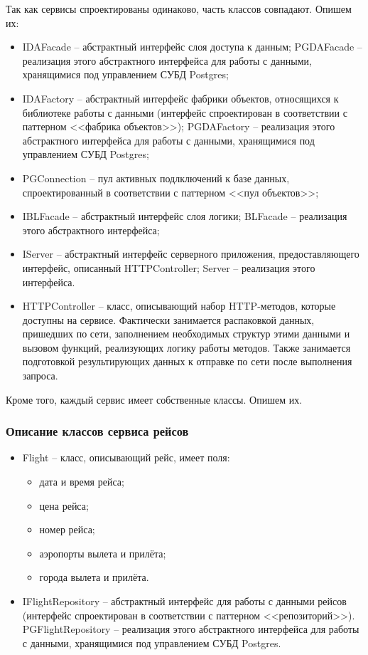 Так как сервисы спроектированы одинаково, часть классов совпадают. Опишем их:
\begin{itemize}
    \item IDAFacade -- абстрактный интерфейс слоя доступа к данным; PGDAFacade -- реализация этого абстрактного интерфейса для работы с данными, хранящимися под управлением СУБД Postgres;
    \item IDAFactory -- абстрактный интерфейс фабрики объектов, относящихся к библиотеке работы с данными (интерфейс спроектирован в соответствии с паттерном <<фабрика объектов>>); PGDAFactory -- реализация этого абстрактного интерфейса для работы с данными, хранящимися под управлением СУБД Postgres;
    \item PGConnection -- пул активных подлключений к базе данных, спроектированный в соответствии с паттерном <<пул объектов>>;
    \item IBLFacade -- абстрактный интерфейс слоя логики; BLFacade -- реализация этого абстрактного интерфейса;
    \item IServer -- абстрактный интерфейс серверного приложения, предоставляющего интерфейс, описанный HTTPController; Server -- реализация этого интерфейса.
    \item HTTPController -- класс, описывающий набор  HTTP-методов, которые доступны на сервисе. Фактически занимается распаковкой данных, пришедших по сети, заполнением необходимых структур этими данными и вызовом функций, реализующих логику работы методов. Также занимается подготовкой результирующих данных к отправке по сети после выполнения запроса. 
\end{itemize}

Кроме того, каждый сервис имеет собственные классы. Опишем их.

\subsubsection{Описание классов сервиса рейсов}

\begin{itemize}
    \item Flight -- класс, описывающий рейс, имеет поля:
    \begin{itemize}
        \item дата и время рейса;
        \item цена рейса;
        \item номер рейса;
        \item аэропорты вылета и прилёта;
        \item города вылета и прилёта.
    \end{itemize}
    \item IFlightRepository -- абстрактный интерфейс для работы с данными рейсов (интерфейс спроектирован в соответствии с паттерном <<репозиторий>>). PGFlightRepository -- реализация этого абстрактного интерфейса для работы с данными, хранящимися под управлением СУБД Postgres.
\end{itemize}

